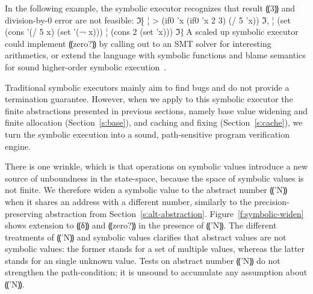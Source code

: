 In the following example, the symbolic executor recognizes that result ⸨3⸩ and
division-by-0 error are not feasible:
ℑ⁅
¦ > (if0 'x (if0 'x 2 3) (/ 5 'x))
ℑ,
¦ (set (cons '(/ 5 x) (set '(¬ x)))
¦      (cons 2 (set 'x)))
ℑ⁆
A scaled up symbolic executor could implement ⸨zero?⸩ by calling out to an SMT
solver for interesting arithmetics, or extend the language with symbolic
functions and blame semantics for sound higher-order symbolic
execution~\cite{dvanhorn:TobinHochstadt2012Higherorder,dvanhorn:Nguyen2015Relatively}.

\newcommand{\lamif}{«λ⦑IF⦒» }


Traditional symbolic executors mainly aim to find bugs and do not
provide a termination guarantee. However, when we apply to this
symbolic executor the finite abstractions presented in previous
sections, namely base value widening and finite allocation
(Section~\ref{s:base}), and caching and fixing
(Section~\ref{s:cache}), we turn the symbolic execution into a sound,
path-sensitive program verification engine.

There is one wrinkle, which is that operations on symbolic values
introduce a new source of unboundness in the state-space, because the
space of symbolic values is not finite. We therefore widen a symbolic
value to the abstract number ⸨'N⸩ when it shares an address with a
different number, similarly to the precision-preserving abstraction
from Section~\ref{s:alt-abstraction}. Figure~\ref{f:symbolic-widen}
shows extension to ⸨δ⸩ and ⸨zero?⸩ in the presence of ⸨'N⸩. The
different treatments of ⸨'N⸩ and symbolic values clarifies that
abstract values are not symbolic values: the former stands for a set
of multiple values, whereas the latter stands for an single unknown
value. Tests on abstract number ⸨'N⸩ do not strengthen the
path-condition; it is unsound to accumulate any assumption about ⸨'N⸩.

